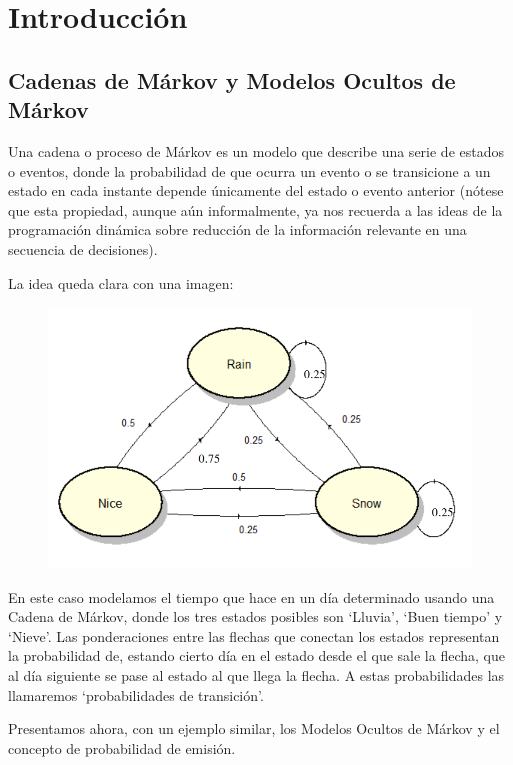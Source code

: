 \documentclass{article}
\begin{document}
\section{Introducción}

\subsection{Cadenas de Márkov y Modelos Ocultos de Márkov} \label{sec:markov-models}

Una cadena o proceso de Márkov es un modelo que describe
una serie de estados o eventos, donde la probabilidad de
que ocurra un evento o se transicione a un estado en 
cada instante depende únicamente del estado o evento anterior
(nótese que esta propiedad, aunque aún informalmente, ya nos
recuerda a las ideas de la programación dinámica sobre
reducción de la información relevante en una secuencia
de decisiones).

La idea queda clara con una imagen:
\begin{figure}[H]
    \centering
    \includegraphics[scale=0.40]{Images/markovChain.png}
\end{figure}

En este caso modelamos el tiempo que hace en un día determinado
usando una Cadena de Márkov, donde los tres estados posibles son
`Lluvia', `Buen tiempo' y `Nieve'. Las ponderaciones entre
las flechas que conectan los estados representan la probabilidad
de, estando cierto día en el estado desde el que sale 
la flecha, que al día siguiente se pase al estado al que
llega la flecha. A estas probabilidades las llamaremos
`probabilidades de transición'.

Presentamos ahora, con un ejemplo similar, los Modelos Ocultos
de Márkov y el concepto de probabilidad de emisión.
\end{document}
